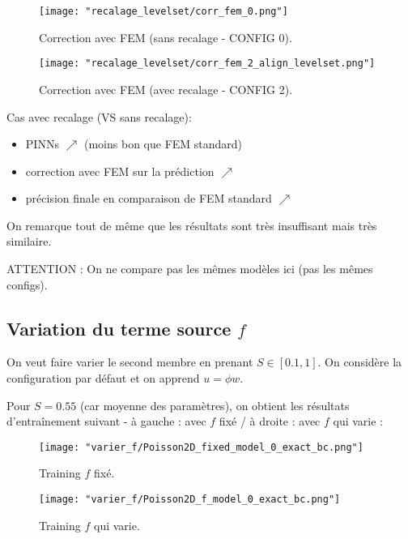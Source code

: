 \begin{minipage}{0.48\linewidth}
	\begin{figure}[H]
		\centering
		\texttt{[image: "recalage\_levelset/corr\_fem\_0.png"]}
		\caption{Correction avec FEM (sans recalage - CONFIG 0).}
	\end{figure}
\end{minipage}
\begin{minipage}{0.48\linewidth}
	\begin{figure}[H]
		\centering
		\texttt{[image: "recalage\_levelset/corr\_fem\_2\_align\_levelset.png"]}
		\caption{Correction avec FEM (avec recalage - CONFIG 2).}
	\end{figure}
\end{minipage}

\begin{Obs}
	Cas avec recalage (VS sans recalage):
	\begin{itemize}
		\item PINNs $\nearrow$ (moins bon que FEM standard)
		\item correction avec FEM sur la prédiction $\nearrow$
		\item précision finale en comparaison de FEM standard $\nearrow$
	\end{itemize}
	
	On remarque tout de même que les résultats sont très insuffisant mais très similaire.
	
	ATTENTION : On ne compare pas les mêmes modèles ici (pas les mêmes configs).
\end{Obs}

\subsection{Variation du terme source $f$}

On veut faire varier le second membre en prenant $S\in[0.1,1]$. On considère la configuration par défaut et on apprend $u=\phi w$.

Pour $S=0.55$ (car moyenne des paramètres), on obtient les résultats d'entraînement suivant - à gauche : avec $f$ fixé / à droite : avec $f$ qui varie :

\begin{minipage}{0.48\linewidth}
	\begin{figure}[H]
		\centering
		\texttt{[image: "varier\_f/Poisson2D\_fixed\_model\_0\_exact\_bc.png"]}
		\caption{Training $f$ fixé.}
	\end{figure}
\end{minipage}
\begin{minipage}{0.48\linewidth}
	\begin{figure}[H]
		\centering
		\texttt{[image: "varier\_f/Poisson2D\_f\_model\_0\_exact\_bc.png"]}
		\caption{Training $f$ qui varie.}
	\end{figure}
\end{minipage}

